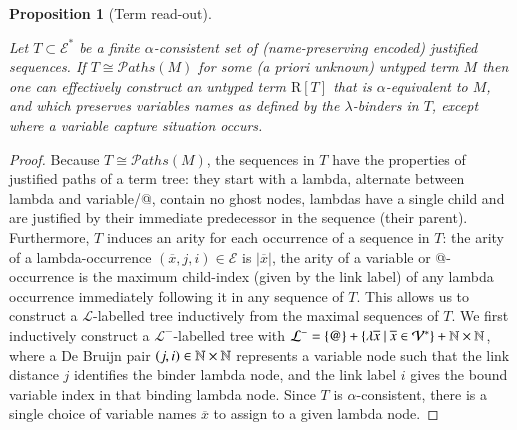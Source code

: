 \documentclass{elsarticle}
\theoremstyle{plain}
\newtheorem{proposition}[theorem]{Proposition}
\theoremstyle{definition}
\def\structisomorphic{\cong} %
\def\readout{\mathrm{R}} %
\def\nameencoding{\mathcal{E}} %
\newcommand\pathset{{\mathcal{P}aths}} %
\begin{document}
\begin{proposition}[Term read-out]
\label{proposition:termtree_readout_from_justitied_paths}

Let $T\subset \nameencoding^*$ be a finite $\alpha$-consistent set of (name-preserving encoded) justified sequences.
If $T\structisomorphic \pathset(M)$ for some (a priori unknown) untyped term $M$ then one can effectively construct an untyped
term  $\readout[T]$ that is $\alpha$-equivalent to $M$,
and which preserves variables names as defined by the $\lambda$-binders in $T$, except where a variable capture situation occurs.
\end{proposition}
\begin{proof}
    Because $T \structisomorphic \pathset(M)$, the sequences in $T$ have the properties
of justified paths of a term tree: they start with a lambda, alternate between lambda and variable/@, contain no ghost nodes, lambdas have
a single child and are justified by their immediate predecessor in the sequence (their parent).
Furthermore, $T$ induces an arity for each occurrence of a sequence in $T$: the arity of a lambda-occurrence $(\overline{x},j,i)\in\nameencoding$ is $|\overline{x}|$, the arity of a variable or @-occurrence is the maximum
child-index (given by the link label) of any lambda occurrence immediately following it in any sequence of $T$.
%
This allows us to construct a $\mathcal{L}$-labelled tree
inductively from the maximal sequences of $T$.
We first inductively construct a $\mathcal{L^-}$-labelled tree with
$\mathcal{L^-} = \{ @ \} + \{
    \lambda \overline{x} \ | \
    \overline{x} \in \mathcal{V}^* \} + \mathbb{N}\times\mathbb{N}$,
where a De Bruijn pair $(j,i)\in \mathbb{N}\times\mathbb{N}$ represents a variable node such that the link distance $j$ identifies the binder lambda node, and the link label $i$ gives the bound variable index in that binding lambda node. Since $T$ is $\alpha$-consistent, there is a single choice of variable names $\overline{x}$ to assign to a given lambda node.


\end{proof}
\end{document}
